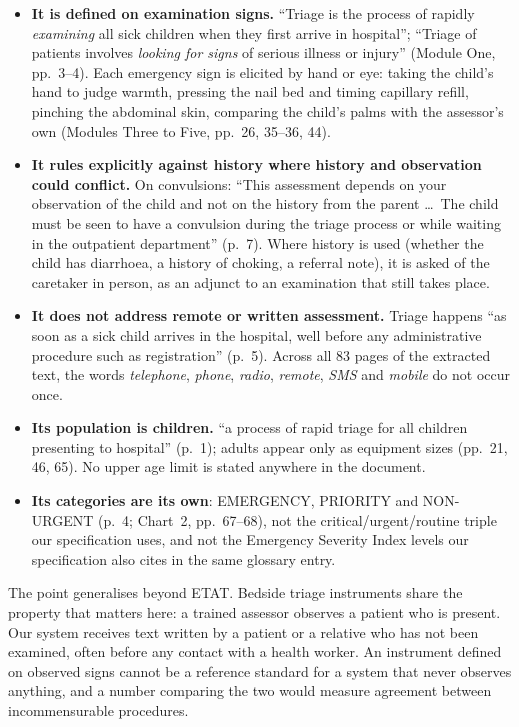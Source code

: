 \begin{itemize}
\item \textbf{It is defined on examination signs.} ``Triage is the process of
  rapidly \emph{examining} all sick children when they first arrive in
  hospital''; ``Triage of patients involves \emph{looking for signs} of serious
  illness or injury'' (Module One, pp.~3--4). Each emergency sign is elicited by
  hand or eye: taking the child's hand to judge warmth, pressing the nail bed and
  timing capillary refill, pinching the abdominal skin, comparing the child's
  palms with the assessor's own (Modules Three to Five, pp.~26, 35--36, 44).
\item \textbf{It rules explicitly against history where history and observation
  could conflict.} On convulsions: ``This assessment depends on your observation
  of the child and not on the history from the parent \dots\ The child must be
  seen to have a convulsion during the triage process or while waiting in the
  outpatient department'' (p.~7). Where history is used (whether the child has
  diarrhoea, a history of choking, a referral note), it is asked of the
  caretaker in person, as an adjunct to an examination that still takes place.
\item \textbf{It does not address remote or written assessment.} Triage happens
  ``as soon as a sick child arrives in the hospital, well before any
  administrative procedure such as registration'' (p.~5). Across all 83 pages of
  the extracted text, the words \emph{telephone}, \emph{phone}, \emph{radio},
  \emph{remote}, \emph{SMS} and \emph{mobile} do not occur once.
\item \textbf{Its population is children.} ``a process of rapid triage for all
  children presenting to hospital'' (p.~1); adults appear only as equipment sizes
  (pp.~21, 46, 65). No upper age limit is stated anywhere in the document.
\item \textbf{Its categories are its own}: EMERGENCY, PRIORITY and NON-URGENT
  (p.~4; Chart~2, pp.~67--68), not the critical/urgent/routine triple our
  specification uses, and not the Emergency Severity Index levels our
  specification also cites in the same glossary entry.
\end{itemize}

The point generalises beyond ETAT. Bedside triage instruments share the property
that matters here: a trained assessor observes a patient who is present. Our
system receives text written by a patient or a relative who has not been
examined, often before any contact with a health worker. An instrument defined on
observed signs cannot be a reference standard for a system that never observes
anything, and a number comparing the two would measure agreement between
incommensurable procedures.

